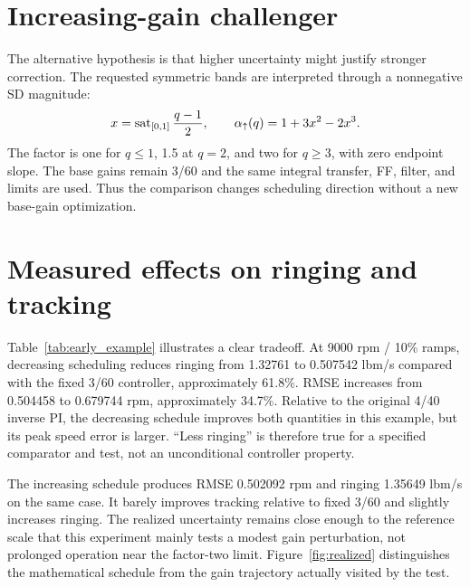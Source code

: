 \section{Increasing-gain challenger}
The alternative hypothesis is that higher uncertainty might justify stronger correction. The requested symmetric bands are interpreted through a nonnegative SD magnitude:
\begin{equation}
x=\operatorname{sat}_{[0,1]}\frac{q-1}{2},\qquad
\alpha_\uparrow(q)=1+3x^2-2x^3.
\label{eq:up}
\end{equation}
The factor is one for $q\leq1$, 1.5 at $q=2$, and two for $q\geq3$, with zero endpoint slope. The base gains remain 3/60 and the same integral transfer, FF, filter, and limits are used. Thus the comparison changes scheduling direction without a new base-gain optimization.


\section{Measured effects on ringing and tracking}

Table~\ref{tab:early_example} illustrates a clear tradeoff. At 9000 rpm / 10\% ramps, decreasing scheduling reduces ringing from 1.32761 to 0.507542 lbm/s compared with the fixed 3/60 controller, approximately 61.8\%. RMSE increases from 0.504458 to 0.679744 rpm, approximately 34.7\%. Relative to the original 4/40 inverse PI, the decreasing schedule improves both quantities in this example, but its peak speed error is larger. ``Less ringing'' is therefore true for a specified comparator and test, not an unconditional controller property.

The increasing schedule produces RMSE 0.502092 rpm and ringing 1.35649 lbm/s on the same case. It barely improves tracking relative to fixed 3/60 and slightly increases ringing. The realized uncertainty remains close enough to the reference scale that this experiment mainly tests a modest gain perturbation, not prolonged operation near the factor-two limit. Figure~\ref{fig:realized} distinguishes the mathematical schedule from the gain trajectory actually visited by the test.

